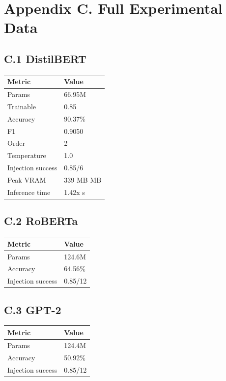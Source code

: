 \section{Appendix C. Full Experimental Data}

\subsection{C.1 DistilBERT}

\begin{table}[H]
\centering
\small
\begin{tabular}{ll}
\toprule
\textbf{Metric} & \textbf{Value} \\
\midrule
Params & 66.95M \\
Trainable & 0.85 \\
Accuracy & 90.37\% \\
F1 & 0.9050 \\
Order & 2 \\
Temperature & 1.0 \\
Injection success & 0.85/6 \\
Peak VRAM & 339 MB MB \\
Inference time & 1.42x s \\
\bottomrule
\end{tabular}
\end{table}

\subsection{C.2 RoBERTa}

\begin{table}[H]
\centering
\small
\begin{tabular}{ll}
\toprule
\textbf{Metric} & \textbf{Value} \\
\midrule
Params & 124.6M \\
Accuracy & 64.56\% \\
Injection success & 0.85/12 \\
\bottomrule
\end{tabular}
\end{table}

\subsection{C.3 GPT-2}

\begin{table}[H]
\centering
\small
\begin{tabular}{ll}
\toprule
\textbf{Metric} & \textbf{Value} \\
\midrule
Params & 124.4M \\
Accuracy & 50.92\% \\
Injection success & 0.85/12 \\
\bottomrule
\end{tabular}
\end{table}

